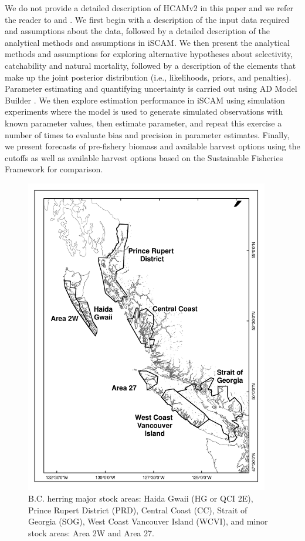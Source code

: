We do not provide a detailed description of HCAMv2 in this paper and we refer the reader to \cite{schweigert2009stock} and \cite{Clear2010}.  We first begin with a description of the input data required and assumptions about the data, followed by a detailed description of the analytical methods and assumptions in iSCAM. We then present the analytical methods and assumptions for exploring alternative hypotheses about selectivity, catchability and natural mortality, followed by a description of the elements that make up the joint posterior distribution (i.e., likelihoods, priors, and penalties).  Parameter estimating and quantifying uncertainty is carried out using AD Model Builder \citep{ADMB2009}.  We then explore estimation performance in iSCAM using simulation experiments where the model is used to generate simulated observations with known parameter values, then estimate parameter, and repeat this exercise a number of times to evaluate bias and precision in parameter estimates.  Finally, we present forecasts of pre-fishery biomass and available harvest options using the cutoffs \cite[e.g., reproduce Table 5 in ][]{Clear2010} as well as available harvest options based on the Sustainable Fisheries Framework \citep[i.e.,][]{dfo2006} for comparison.

\begin{figure}[!tbp]
	\includegraphics[width=0.95\textwidth]{../FIGS/PBSfigs/Assessment_Regions_2W_27_2010_HG.pdf}
	\caption{B.C. herring major stock areas: Haida Gwaii (HG or QCI 2E), Prince Rupert District (PRD), Central
Coast (CC), Strait of Georgia (SOG), West Coast Vancouver Island (WCVI), and minor stock areas: Area 2W and
Area 27.}\label{Fig1}
\end{figure}
	
